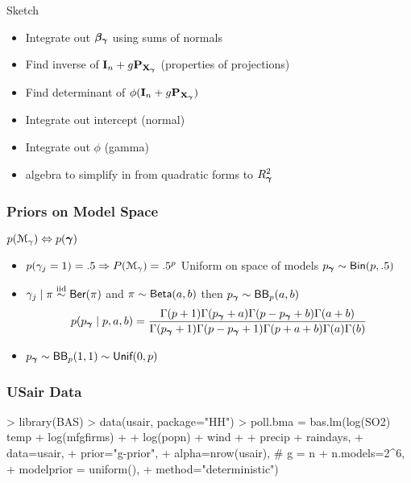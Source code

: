 \documentclass[]{beamer}
\begin{document}
\begin{frame}{Sketch}
\begin{itemize}
  \item  Integrate out $\boldsymbol{\beta_\gamma}$  using sums of normals \pause
  \item  Find inverse of $\mathbf{I}_n + g \mathbf{P}_{\mathbf{X}_{\boldsymbol{\gamma}}}$  (properties of projections) \pause
  \item Find determinant of $\phi (\mathbf{I}_n + g \mathbf{P}_{\mathbf{X}_{\boldsymbol{\gamma}}})$  \pause
  \item Integrate out intercept (normal)  \pause
  \item Integrate out $\phi$  (gamma)  \pause
  \item algebra to simplify in from quadratic forms to  $R^2_{\boldsymbol{\gamma}}$
\end{itemize}

\end{frame}
\begin{frame}
  \frametitle{Priors on Model Space}
  $p({\cal M}_\gamma) \Leftrightarrow p(\boldsymbol{\gamma})$
  \begin{itemize}
  \item $p(\gamma_j = 1) = .5 \Rightarrow P({\cal M}_\gamma) = .5^p$  Uniform on space of models \pause $p_{\boldsymbol{\gamma}} \sim \textsf{Bin}(p, .5)$
\item $\gamma_j \mid \pi \mathrel{\mathop{\sim}\limits^{\rm iid}} \textsf{Ber}(\pi)$ and $\pi \sim \textsf{Beta}(a,b)$ then  $p_{\boldsymbol{\gamma}} \sim \textsf{BB}_p(a, b)$
$$
p(p_{\boldsymbol{\gamma}} \mid p, a, b) = \frac{ \Gamma(p + 1) \Gamma(p_{\boldsymbol{\gamma}} + a) \Gamma(p - p_{\boldsymbol{\gamma}} + b) \Gamma (a + b) }{\Gamma(p_{\boldsymbol{\gamma}}+1) \Gamma(p - p_{\boldsymbol{\gamma}} + 1) \Gamma(p + a + b) \Gamma(a) \Gamma(b)}
$$
\item $p_{\boldsymbol{\gamma}} \sim \textsf{BB}_p(1, 1) \sim \textsf{Unif}(0, p)$
  \end{itemize}
\end{frame}

\begin{frame}[fragile]
\frametitle{USair Data}
\begin{Schunk}
\begin{Sinput}
> library(BAS)
> data(usair, package="HH")
> poll.bma = bas.lm(log(SO2) ~ temp + log(mfgfirms) +
+                              log(popn) + wind +
+                              precip + raindays,
+                   data=usair,
+                   prior="g-prior",
+                   alpha=nrow(usair), # g = n
+                   n.models=2^6,
+                   modelprior = uniform(),
+                   method="deterministic")
\end{Sinput}
\end{Schunk}


\end{frame}
\end{document}

